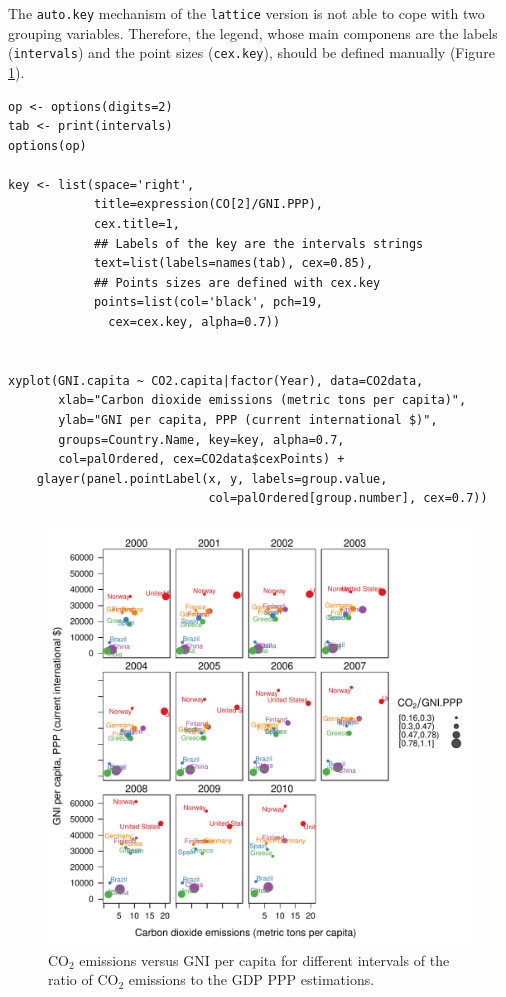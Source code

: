 \documentclass[smallroyalvopaper]{memoir}
\begin{document}
The \texttt{auto.key} mechanism of the \texttt{lattice} version is not able to cope
with two grouping variables. Therefore, the legend, whose main
componens are the labels (\texttt{intervals}) and the point sizes
(\texttt{cex.key}), should be defined manually (Figure \ref{fig:CO2points}).


\lstset{language=R,numbers=none}
\begin{lstlisting}
op <- options(digits=2)
tab <- print(intervals)
options(op)

key <- list(space='right',
            title=expression(CO[2]/GNI.PPP),
            cex.title=1,
            ## Labels of the key are the intervals strings
            text=list(labels=names(tab), cex=0.85),
            ## Points sizes are defined with cex.key
            points=list(col='black', pch=19,
              cex=cex.key, alpha=0.7))


xyplot(GNI.capita ~ CO2.capita|factor(Year), data=CO2data,
       xlab="Carbon dioxide emissions (metric tons per capita)",
       ylab="GNI per capita, PPP (current international $)",
       groups=Country.Name, key=key, alpha=0.7,
       col=palOrdered, cex=CO2data$cexPoints) +
    glayer(panel.pointLabel(x, y, labels=group.value,
                            col=palOrdered[group.number], cex=0.7))
\end{lstlisting}

\begin{figure}[htb]
\centering
\includegraphics[width=.9\linewidth]{figs/CO2points.pdf}
\caption{\label{fig:CO2points}$\mathrm{CO_2}$ emissions versus GNI per capita for different intervals of the ratio of $\mathrm{CO_2}$ emissions to the GDP PPP estimations.}
\end{figure}
\end{document}
